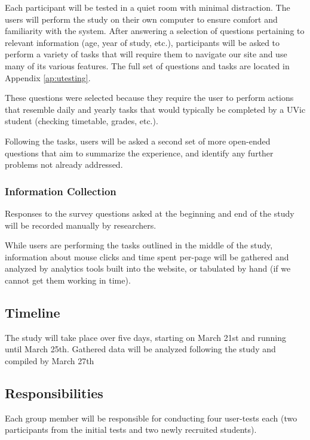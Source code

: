 \documentclass{article}
\begin{document}
Each participant will be tested in a quiet room with minimal distraction. The users will perform the study on their own computer to ensure comfort and familiarity with the system. After answering a selection of questions pertaining to relevant information (age, year of study, etc.), participants will be asked to perform a variety of tasks that will require them to navigate our site and use many of its various features. The full set of questions and tasks are located in Appendix \ref{ap:utesting}.

These questions were selected because they require the user to perform actions that resemble daily and yearly tasks that would typically be completed by a UVic student (checking timetable, grades, etc.).

Following the tasks, users will be asked a second set of more open-ended questions that aim to summarize the experience, and identify any further problems not already addressed.

\subsubsection{Information Collection}

Responses to the survey questions asked at the beginning and end of the study will be recorded manually by researchers.

While users are performing the tasks outlined in the middle of the study, information about mouse clicks and time spent per-page will be gathered and analyzed by analytics tools built into the website, or tabulated by hand (if we cannot get them working in time).

\subsection{Timeline}

The study will take place over five days, starting on March 21st and running until March 25th. Gathered data will be analyzed following the study and compiled by March 27th

\subsection{Responsibilities}

Each group member will be responsible for conducting four user-tests each (two participants from the initial tests and two newly recruited students).
\end{document}
